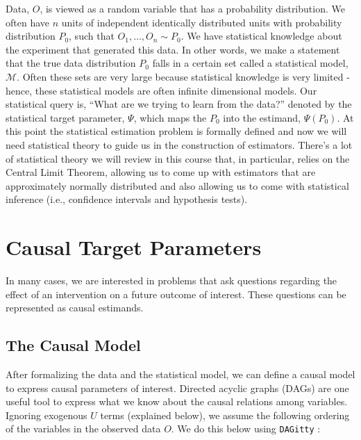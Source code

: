 \documentclass[
  12pt, krantz2,
]{book}
\theoremstyle{definition}
\theoremstyle{definition}
\theoremstyle{definition}
\newcommand{\1}{\mathbbm{1}}
\begin{document}
Data, \(O\), is viewed as a random variable that has a probability distribution.
We often have \(n\) units of independent identically distributed units with
probability distribution \(P_0\), such that \(O_1, \ldots, O_n \sim P_0\). We have
statistical knowledge about the experiment that generated this data. In other
words, we make a statement that the true data distribution \(P_0\) falls in a
certain set called a statistical model, \(\mathcal{M}\). Often these sets are very
large because statistical knowledge is very limited - hence, these statistical
models are often infinite dimensional models. Our statistical query is, ``What
are we trying to learn from the data?'' denoted by the statistical target
parameter, \(\Psi\), which maps the \(P_0\) into the estimand, \(\Psi(P_0)\). At this
point the statistical estimation problem is formally defined and now we will
need statistical theory to guide us in the construction of estimators. There's a
lot of statistical theory we will review in this course that, in particular,
relies on the Central Limit Theorem, allowing us to come up with estimators that
are approximately normally distributed and also allowing us to come with
statistical inference (i.e., confidence intervals and hypothesis tests).

\hypertarget{causal}{%
\section{Causal Target Parameters}\label{causal}}

In many cases, we are interested in problems that ask questions regarding the
effect of an intervention on a future outcome of interest. These questions can
be represented as causal estimands.

\hypertarget{the-causal-model}{%
\subsection*{The Causal Model}\label{the-causal-model}}


After formalizing the data and the statistical model, we can define a causal
model to express causal parameters of interest. Directed acyclic graphs (DAGs)
are one useful tool to express what we know about the causal relations among
variables. Ignoring exogenous \(U\) terms (explained below), we assume the
following ordering of the variables in the observed data \(O\). We do this below
using \texttt{DAGitty} \citep{textor2011dagitty}:
\end{document}
